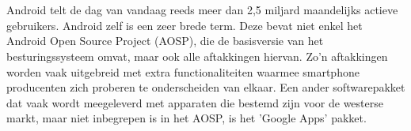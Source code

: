 
%
%

%



\chapter*{}

Android telt de dag van vandaag reeds meer dan 2,5 miljard maandelijks actieve gebruikers. Android zelf is een zeer brede term. Deze bevat niet enkel het Android Open Source Project (AOSP), die de basisversie van het besturingssysteem omvat, maar ook alle aftakkingen hiervan. Zo'n aftakkingen worden vaak uitgebreid met extra functionaliteiten waarmee smartphone producenten zich proberen te onderscheiden van elkaar. Een ander softwarepakket dat vaak wordt meegeleverd met apparaten die bestemd zijn voor de westerse markt, maar niet inbegrepen is in het AOSP, is het 'Google Apps' pakket.

